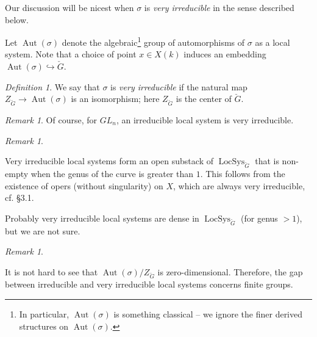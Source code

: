 \documentclass[reqno,11pt]{amsart}
\numberwithin{equation}{subsection}
\theoremstyle{remark}
\newtheorem{rem}[thm]{Remark}
\newtheorem{defin}[thm]{Definition}
\newcommand{\into}{\hookrightarrow}
\newcommand{\on}{\operatorname}
\newcommand{\Aut}{\on{Aut}}
\newcommand{\LocSys}{\on{LocSys}}
\begin{document}
Our discussion will be nicest when $\sigma$ is \emph{very irreducible}
in the sense described below.  

Let $\Aut(\sigma)$ denote the algebraic\footnote{In
particular, $\Aut(\sigma)$ is something classical -- we ignore
the finer derived structures on $\Aut(\sigma)$.} 
group of automorphisms of $\sigma$ as a local system. 
Note that a choice of point $x \in X(k)$ induces an embedding
$\Aut(\sigma) \into \check{G}$. 

\begin{defin}

We say that $\sigma$ is \emph{very irreducible} if the natural
map $Z_{\check{G}} \to \Aut(\sigma)$ is an isomorphism;
here $Z_{\check{G}}$ is the center of $\check{G}$.

\end{defin}

\begin{rem}

Of course, for $GL_n$, an irreducible local system is very irreducible.

\end{rem}

\begin{rem}\label{r:oper-very-irred}

Very irreducible local systems form an open substack
of $\LocSys_{\check{G}}$ that is non-empty when the genus 
of the curve is greater than $1$. 
This follows from the
existence of opers (without singularity) 
on $X$, which are always very irreducible, 
cf. \cite{hitchin} \S 3.1.

Probably very irreducible local systems are dense in $\LocSys_{\check{G}}$
(for genus $>1$), but we are not sure.

\end{rem}

\begin{rem}\label{r:finite-gps}

It is not hard to see that $\Aut(\sigma)/Z_{\check{G}}$ is zero-dimensional.
Therefore, the gap between irreducible and very irreducible local
systems concerns finite groups.

\end{rem}
\end{document}
